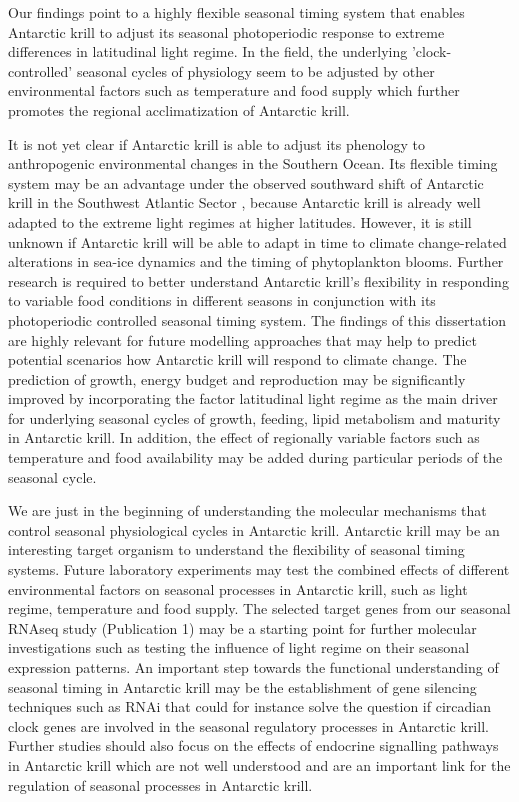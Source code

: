 Our findings point to a highly flexible seasonal timing system that enables
Antarctic krill to adjust its seasonal photoperiodic response to extreme
differences in latitudinal light regime. In the field, the underlying
'clock-controlled' seasonal cycles of physiology seem to be adjusted by other
environmental factors such as temperature and food supply which further
promotes the regional acclimatization of Antarctic krill.

It is not yet clear if Antarctic krill is able to adjust its phenology to
anthropogenic environmental changes in the Southern Ocean. Its flexible timing
system may be an advantage under the observed southward shift of Antarctic
krill in the Southwest Atlantic Sector \citep{atkinson_krill_2019}, because
Antarctic krill is already well adapted to the extreme light regimes at higher
latitudes. However, it is still unknown if Antarctic krill will be able to
adapt in time to climate change-related alterations in sea-ice dynamics and the
timing of phytoplankton blooms. Further research is required to better
understand Antarctic krill's flexibility in responding to variable food
conditions in different seasons in conjunction with its photoperiodic
controlled seasonal timing system. The findings of this dissertation are highly
relevant for future modelling approaches that may help to predict potential
scenarios how Antarctic krill will respond to climate change. The prediction of
growth, energy budget and reproduction may be significantly improved by
incorporating the factor latitudinal light regime as the main driver for
underlying seasonal cycles of growth, feeding, lipid metabolism and maturity in
Antarctic krill. In addition, the effect of regionally variable factors such as
temperature and food availability may be added during particular periods of the
seasonal cycle.

We are just in the beginning of understanding the molecular mechanisms that
control seasonal physiological cycles in Antarctic krill. Antarctic krill may
be an interesting target organism to understand the flexibility of seasonal
timing systems. Future laboratory experiments may test the combined effects of
different environmental factors on seasonal processes in Antarctic krill, such
as light regime, temperature and food supply. The selected target genes from
our seasonal RNAseq study (Publication 1) may be a starting point for further
molecular investigations such as testing the influence of light regime on their
seasonal expression patterns. An important step towards the functional
understanding of seasonal timing in Antarctic krill may be the establishment of
gene silencing techniques such as RNAi that could for instance solve the
question if circadian clock genes are involved in the seasonal regulatory
processes in Antarctic krill. Further studies should also focus on the effects
of endocrine signalling pathways in Antarctic krill which are not well
understood and are an important link for the regulation of seasonal processes
in Antarctic krill.

\printbibliography[heading=subbibliography]
